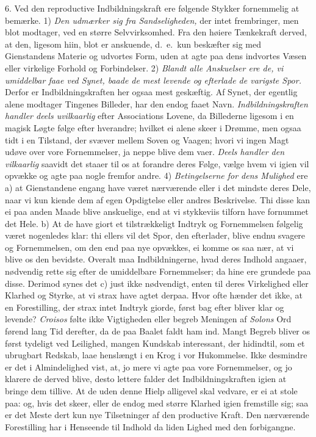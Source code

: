 \documentclass[12pt,a4paper]{article}
\newcommand{\opage}[1]{\marginnote{\footnotesize\textit{[#1]}}}
\begin{document}
6. Ved den reproductive Indbildningskraft ere følgende Stykker fornemmelig at bemærke.
1) \emph{Den udmærker sig fra Sandseligheden,} der intet frembringer, men blot modtager,
ved en større Selvvirksomhed. Fra den høiere Tænkekraft derved, at den, ligesom hiin,
blot er anskuende, d.~e.\ kun beskæfter sig med Gienstandens Materie og udvortes Form,
uden at agte paa dens indvortes Væsen eller virkelige Forhold og Forbindelser.
2) \emph{Blandt alle Anskuelser ere de, vi umiddelbar faae ved Synet, baade de mest
levende og efterlade de varigste Spor.} Derfor er Indbildningskraften her ogsaa mest
geskæftig. Af Synet, der egentlig alene modtager Tingenes Billeder, har den endog faaet
Navn. \emph{Indbildningskraften handler deels uvilkaarlig} efter Associations Lovene, da
Billederne ligesom i en magisk Løgte følge efter hverandre; hvilket ei alene skeer i
Drømme, men ogsaa tidt i en Tilstand, der svæver mellem Soven og Vaagen; hvori vi ingen
Magt udøve over vore Fornemmelser, ja neppe blive dem vaer. \emph{Deels handler den
vilkaarlig} saavidt det staaer til os at forandre deres Følge, vælge hvem vi igien vil
opvække og agte paa nogle fremfor andre. 4) \emph{Betingelserne for dens Mulighed} ere
a) at Gienstandene engang have
\opage{107} været nærværende eller i det mindste deres Dele, naar vi kun kiende dem af egen
Opdigtelse eller andres Beskrivelse. Thi disse kan ei paa anden Maade blive anskuelige,
end at vi stykkeviis tilforn have fornummet det Hele. b) At de have giort et
tilstrækkeligt Indtryk og Fornemmelsen følgelig været nogenledes klar: thi ellers vil det
Spor, den efterlader, blive endnu svagere og Fornemmelsen, om den end paa nye opvækkes,
ei komme os saa nær, at vi blive os den bevidste. Overalt maa Indbildningerne, hvad deres
Indhold angaaer, nødvendig rette sig efter de umiddelbare Fornemmelser; da hine ere
grundede paa disse. Derimod synes det c) just ikke nødvendigt, enten til deres
Virkelighed eller Klarhed og Styrke, at vi strax have agtet derpaa. Hvor ofte hænder det
ikke, at en Forestilling, der strax intet Indtryk giorde, først bag efter bliver klar og
levende? \emph{Croisos} følte ikke Vigtigheden eller begreb Meningen af \emph{Solons} Ord
førend lang Tid derefter, da de paa Baalet faldt ham ind. Mangt Begreb bliver os først
tydeligt ved Leilighed, mangen Kundskab interessant, der hidindtil, som et ubrugbart
Redskab, laae henslængt i en Krog i vor Hukommelse. Ikke desmindre er det i Almindelighed
vist, at, jo mere vi agte paa vore Fornemmelser, og jo klarere de derved blive, desto
lettere falder det Indbildningskraften igien at bringe dem tillive. At de uden denne
Hielp alligevel skal vedvare, er ei at stole paa: og, hvis det skeer, eller de endog med
\opage{108} større Klarhed igien fremstille sig; saa er det Meste dert kun nye Tilsetninger af den
productive Kraft. Den nærværende Forestilling har i Henseende til Indhold da liden Lighed
med den forbigangne.
\end{document}
